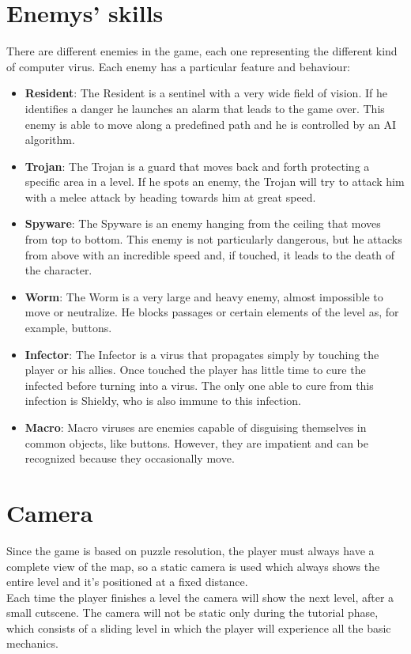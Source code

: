 \documentclass[12pt, a4paper]{report}
\begin{document}
\section*{Enemys' skills}
There are different enemies in the game, each one representing the different kind of computer virus. Each enemy has a particular feature and behaviour:
\begin{itemize}
	\item \textbf{Resident}: The Resident is a sentinel with a very wide field of vision. If he identifies a danger he launches an alarm that leads to the game over. This enemy is able to move along a predefined path and he is controlled by an AI algorithm.
	\item \textbf{Trojan}: The Trojan is a guard that moves back and forth protecting a specific area in a level. If he spots an enemy, the Trojan will try to attack him with a melee attack by heading towards him at great speed.
	\item \textbf{Spyware}: The Spyware is an enemy hanging from the ceiling that moves from top to bottom. This enemy is not particularly dangerous, but he attacks from above with an incredible speed and, if touched, it leads to the death of the character.
	\item \textbf{Worm}: The Worm is a very large and heavy enemy, almost impossible to move or neutralize. He blocks passages or certain elements of the level as, for example, buttons.
	\item \textbf{Infector}: The Infector is a virus that propagates simply by touching the player or his allies. Once touched the player has little time to cure the infected before turning into a virus. The only one able to cure from this infection is Shieldy, who is also immune to this infection.
	\item \textbf{Macro}: Macro viruses are enemies capable of disguising themselves in common objects, like buttons. However, they are impatient and can be recognized because they occasionally move.
\end{itemize}




\section*{Camera}
Since the game is based on puzzle resolution, the player must always have a complete view of the map, so a static camera is used which always shows the entire level and it's positioned at a fixed distance.\\
Each time the player finishes a level the camera will show the next level, after a small cutscene. The camera will not be static only during the tutorial phase, which consists of a sliding level in which the player will experience all the basic mechanics.
\end{document}
